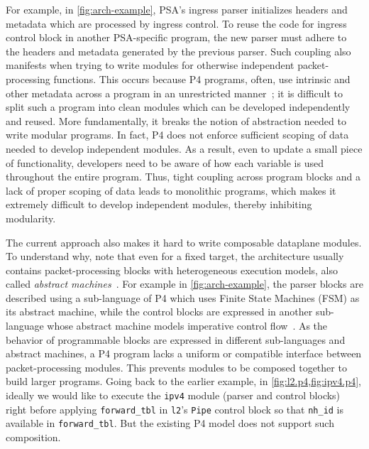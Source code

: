 \documentclass[letterpaper,twocolumn,10pt]{article}
\begin{document}
 For example, 
in
\cref{fig:arch-example}, PSA's ingress parser initializes headers and
metadata which are processed by ingress control. To reuse the code for
ingress control block in another PSA-specific program, the new parser
must adhere to the headers and metadata generated by the previous
parser. Such coupling also manifests when trying to write modules for
otherwise independent packet-processing functions. This occurs because
P4 programs, often, use intrinsic and other metadata across a program
in an unrestricted manner~\cite{switch.p4}; it is difficult to split
such a program into clean modules which can be developed independently
and reused. More fundamentally, it breaks the notion of abstraction
needed to write modular programs. In fact, P4 does not enforce
sufficient scoping of data needed to develop independent modules. As a
result, even to update a small piece of functionality, developers need
to be aware of how each variable is used throughout the entire
program. Thus, tight coupling across program blocks and a lack of
proper scoping of data leads to monolithic programs, which makes it
extremely difficult to develop independent modules, thereby inhibiting
modularity.



%
The current approach also makes it hard to write composable dataplane
modules. To understand why, note that even for a fixed target, the
architecture usually contains packet-processing blocks with
heterogeneous execution models, also called \emph{abstract
machines}~\cite{p4lang,van1991machine}. For example in
\cref{fig:arch-example}, the parser blocks are described using a
sub-language of P4 which uses Finite State Machines (FSM) as its
abstract machine, while the control blocks are expressed in another
sub-language whose abstract machine models imperative control
flow~\cite{p4lang}. As the behavior of programmable blocks are
expressed in different sub-languages and abstract machines, a P4
program lacks a uniform or compatible interface between
packet-processing modules. This prevents modules to be composed
together to build larger programs. Going back to the earlier example,
in \cref{fig:l2.p4,fig:ipv4.p4}, ideally we would like to execute the
\texttt{ipv4} module (parser and control blocks) right before applying
\texttt{forward\_tbl} in \texttt{l2}'s \texttt{Pipe} control block so
that \texttt{nh\_id} is available in \texttt{forward\_tbl}. But the
existing P4 model does not support such composition.
\end{document}
